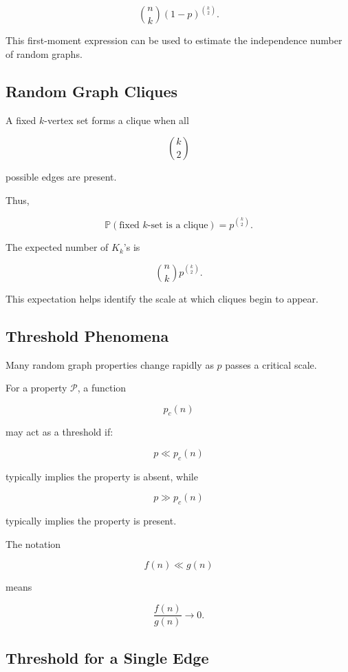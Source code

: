\[
\boxed{
\binom nk
(1-p)^{\binom{k}{2}}.
}
\]

This first-moment expression can be used to estimate the independence
number of random graphs.

\subsection{Random Graph Cliques}
\label{subsec:random-graph-cliques}

A fixed \(k\)-vertex set forms a clique when all

\[
\binom{k}{2}
\]

possible edges are present.

Thus,

\[
\boxed{
\mathbb{P}
(\text{fixed }k\text{-set is a clique})
=
p^{\binom{k}{2}}.
}
\]

The expected number of \(K_k\)'s is

\[
\boxed{
\binom nk
p^{\binom{k}{2}}.
}
\]

This expectation helps identify the scale at which cliques begin to
appear.

\subsection{Threshold Phenomena}
\label{subsec:threshold-phenomena}

Many random graph properties change rapidly as \(p\) passes a critical
scale.

For a property \(\mathcal{P}\), a function

\[
p_c(n)
\]

may act as a threshold if:

\[
p\ll p_c(n)
\]

typically implies the property is absent, while

\[
p\gg p_c(n)
\]

typically implies the property is present.

The notation

\[
f(n)\ll g(n)
\]

means

\[
\frac{f(n)}{g(n)}\to0.
\]

\subsection{Threshold for a Single Edge}
\label{subsec:threshold-single-edge}

